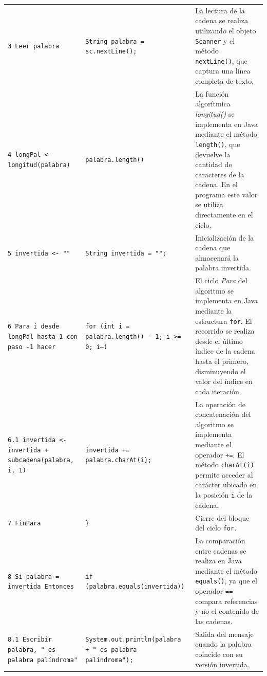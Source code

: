 \documentclass[12pt,twoside]{book}
\begin{document}
\begin{landscape}
\begin{longtable}{p{6cm} p{6cm} p{7cm}}
							
							\texttt{3 Leer palabra}
							&
							\texttt{String palabra = sc.nextLine();}
							&
							La lectura de la cadena se realiza utilizando el objeto \texttt{Scanner} y el método \texttt{nextLine()}, que captura una línea completa de texto. \\
							
							\texttt{4 longPal <- longitud(palabra)}
							&
							\texttt{palabra.length()}
							&
							La función algorítmica \textit{longitud()} se implementa en Java mediante el método \texttt{length()}, que devuelve la cantidad de caracteres de la cadena. En el programa este valor se utiliza directamente en el ciclo. \\
							
							
							\texttt{5 invertida <- ""}
							&
							\texttt{String invertida = "";}
							&
							Inicialización de la cadena que almacenará la palabra invertida. \\
							
							\texttt{6 Para i desde longPal hasta 1 con paso -1 hacer}
							&
							\texttt{for (int i = palabra.length() - 1; i >= 0; i--)}
							&
							El ciclo \textit{Para} del algoritmo se implementa en Java mediante la estructura \texttt{for}. El recorrido se realiza desde el último índice de la cadena hasta el primero, disminuyendo el valor del índice en cada iteración. \\
							
							\texttt{6.1 invertida <- invertida + subcadena(palabra, i, 1)}
							&
							\texttt{invertida += palabra.charAt(i);}
							&
							La operación de concatenación del algoritmo se implementa mediante el operador \texttt{+=}. El método \texttt{charAt(i)} permite acceder al carácter ubicado en la posición \texttt{i} de la cadena. \\
							
							\texttt{7 FinPara}
							&
							\texttt{\}}
							&
							Cierre del bloque del ciclo \texttt{for}. \\
							
							\texttt{8 Si palabra = invertida Entonces}
							&
							\texttt{if (palabra.equals(invertida))}
							&
							La comparación entre cadenas se realiza en Java mediante el método \texttt{equals()}, ya que el operador \texttt{==} compara referencias y no el contenido de las cadenas. \\
							
							\texttt{8.1 Escribir palabra, " es palabra palíndroma"}
							&
							\texttt{System.out.println(palabra + " es palabra palíndroma");}
							&
							Salida del mensaje cuando la palabra coincide con su versión invertida. \\
							

\end{longtable}
\end{landscape}
\end{document}
